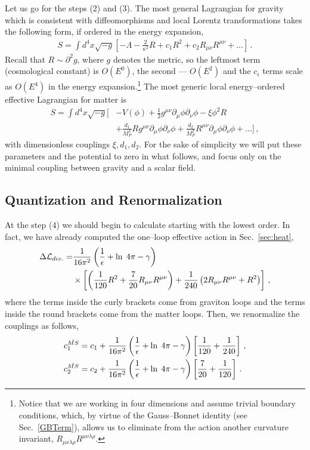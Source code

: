 \documentclass[11pt,a4paper]{article}
\newcommand{\be}{\begin{equation}}
\newcommand{\ee}{\end{equation}}
\newcommand\m{\mu}
\newcommand\n{\nu}
\renewcommand\r{\rho}
\renewcommand\l{\lambda}
\def\d{\partial}
\renewcommand{\ln}{\mathop{\rm ln}\nolimits}
\begin{document}
Let us go for the steps (2) and (3).
The most general Lagrangian for gravity
which is consistent with diffeomorphisms and local Lorentz
transformations takes the following form, if ordered in the energy expansion,
\be
\begin{split}
S=\int d^4x\sqrt{-g}\left[-\Lambda -\frac{2}{\kappa^2}R+c_1 R^2+c_2 R_{\m\n}R^{\m\n}+...\right]\,.
\end{split}
\ee
Recall that $R\sim \d^2 g$, where $g$ denotes the metric, so the leftmost term (cosmological constant) is $O(E^0)$, the second --- $O(E^2)$ and the $c_i$ terms scale as $O(E^4)$ in the
energy expansion.\footnote{Notice that we are working in four dimensions and assume trivial
boundary conditions, which, by virtue of the Gauss--Bonnet identity (see Sec.~\ref{GBTerm}), allows us to eliminate from the action another curvature invariant,
$R_{\mu\nu\l \r}R^{\mu\nu\l \r}$.
}
The most generic local energy--ordered effective Lagrangian for matter is
\be
\begin{split}
S=\int d^4x\sqrt{-g}\Bigg[&-V(\phi)+\frac{1}{2}g^{\m\n}\d_\m\phi\d_\n\phi-\xi \phi^2 R\\
&+\frac{d_1}{M_P^2}Rg^{\m\n}\d_\m\phi\d_\n\phi+\frac{d_2}{M_P^2}R^{\m\n}\d_\m\phi\d_\n\phi
+...\Bigg] \,,
\end{split}
\ee
with dimensionless couplings $\xi,d_1,d_2$. 
For the sake of simplicity we will put these parameters and the potential to zero in
what follows, and focus only on the minimal coupling between gravity and a scalar field.

\subsection{Quantization and Renormalization}

At the step (4) we  should begin to calculate starting with the lowest order. In fact, we have already computed
the one--loop effective action in Sec.~\ref{sec:heat},
\be
\begin{split}
\Delta \mathcal{L}_{div.}=&\frac{1}{16\pi^2} \left(\frac{1}{\epsilon}+\ln \;4\pi-\gamma\right)\\
&\times \left[\left(\frac{1}{120}R^2+\frac{7}{20}R_{\m\n}R^{\m\n}\right)+\frac{1}{240}\left(2R_{\m\n}R^{\m\n}+R^2\right)\right]\,,
\end{split}
\ee
where the terms inside the curly brackets come from graviton loops and the terms inside the round brackets come from the matter loops. Then, we renormalize the couplings as follows,
\be
\begin{split}
& c_1^{\bar{MS}}=c_1+\frac{1}{16\pi^2} \left(\frac{1}{\epsilon}+\ln \;4\pi-\gamma\right)\left[\frac{1}{120}+\frac{1}{240}\right]\,,\\
& c_2^{\bar{MS}}=c_2+\frac{1}{16\pi^2} \left(\frac{1}{\epsilon}+\ln \;4\pi-\gamma\right)\left[\frac{7}{20}+\frac{1}{120}\right]\,.
\end{split}
\ee
\end{document}
